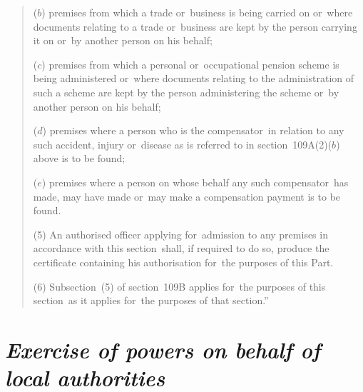 \documentclass[12pt,a4paper]{article}
\begin{document}
\begin{quotation}
\begin{enumerate}
($b$) premises from which a trade or~business is being carried on or~where documents relating to a trade or~business are kept by the person carrying it on or~by another person on his behalf;

($c$) premises from which a personal or~occupational pension scheme is being administered or~where documents relating to the administration of such a scheme are kept by the person administering the scheme or~by another person on his behalf;

($d$) premises where a person who is the compensator~in relation to any such accident, injury or~disease as is referred to in section~109A(2)($b$)  above is to be found;

($e$) premises where a person on whose behalf any such compensator~has made, may have made or~may make a compensation payment is to be found.
\end{enumerate}

\begin{sloppypar}
(5) An authorised officer applying for~admission to any premises in accordance with this section~shall, if required to do so, produce the certificate containing his authorisation for~the purposes of this Part.
\end{sloppypar}

(6) Subsection~(5)  of section~109B applies for~the purposes of this section~as it applies for~the purposes of that section.”
\end{quotation}

\section*{\itshape Exercise of powers on behalf of local authorities}
\end{document}
